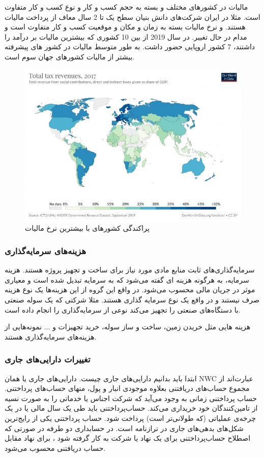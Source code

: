 \documentclass{CCI2020}
\begin{document}
مالیات در کشورهای مختلف و بسته به حجم کسب و کار و نوع کسب و کار متفاوت است. مثلا در ایران شرکت‌های دانش بنیان سطح یک تا 2 سال معاف از پرداخت مالیات هستند. و نرخ مالیات بسته به زمان و مکان و موقعیت کسب و کار متفاوت است و مدام در حال تغییر.
در سال 2019 از بین 10 کشوری که بیشترین مالیات بر درآمد را داشتند، 7 کشور اروپایی حضور داشت. به طور متوسط مالیات در کشور های پیشرفته بیشتر از مالیات کشور‌های جهان سوم است.


\begin{figure}[htb]\centering
\includegraphics[height=0.7\hsize]{images/worldTax.jpg}
\caption{پراکندگی کشورهای با بیشترین نرخ مالیات
\cite{worldTax}}
\end{figure}

\subsubsection{هزینه‌های سرمایه‌گذاری}
سرمایه‌گذاری‌های ثابت منابع مادی مورد نیاز برای ساخت و تجهیز پروژه هستند.
هزینه سرمایه، به هرگونه هزینه‌ ای گفته می‌شود که به سرمایه تبدیل شده است و معیاری موثر در جریان مالی محسوب می‌شود. در واقع این گروه از این هزینه‌ها یک نوع هزینه صرف نیستند و در واقع یک نوع سرمایه گذاری هستند. مثلا شرکتی که یک سوله صنعتی با دستگاه‌های صنعتی را تجهیز می‌کند نوعی از سرمایه‌گذاری را انجام داده است.

هزینه هایی مثل خریدن زمین، ساخت و ساز سوله، خرید تجهیزات و ... نمونه‌هایی از هزینه‌های سرمایه‌گذاری هستند.

\subsubsection{تغییرات دارایی‌های جاری}
ابتدا باید بدانیم دارایی‌های جاری چیست. دارایی‌های جاری یا همان
NWC
عبارت‌اند از مجموع حساب‌های دریافتنی بعلاوه موجودی انبار و پول، منهای حساب‌های پرداختنی.
حساب پرداختنی زمانی به وجود می‌آید که شرکت اجناس یا خدماتی را به صورت نسیه از تامین‌کنندگان خود خریداری می‌کند. حساب‌پرداختنی باید طی یک سال مالی یا در یک چرخه‌ی عملیاتی (که طولانی‌تر است) پرداخت شود. حساب پرداختنی یکی از رایج‌ترین شکل‌های بدهی‌های جاری در ترازنامه است. در حسابداری دو طرفه در صورتی که اصطلاح حساب‌پرداختنی برای یک نهاد یا شرکت به کار گرفته شود ، برای نهاد مقابل حساب دریافتنی محسوب می‌شود.
\end{document}
